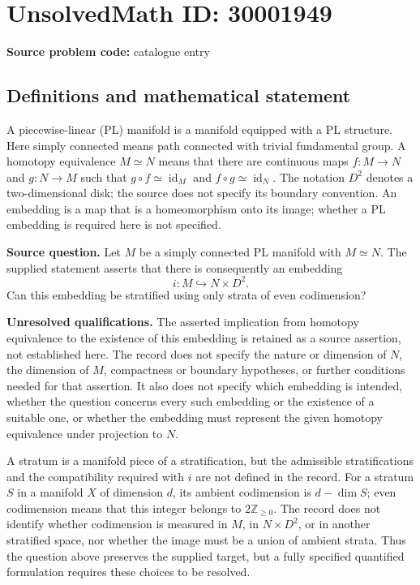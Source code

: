 \documentclass[11pt]{article}
\newcommand{\Z}{\mathbb{Z}}
\begin{document}
\section*{UnsolvedMath ID: 30001949}
\textbf{Source problem code:} catalogue entry
\subsection{Definitions and mathematical statement}
A piecewise-linear (PL) manifold is a manifold equipped with a PL structure. Here simply connected means path connected with trivial fundamental group. A homotopy equivalence \(M\simeq N\) means that there are continuous maps \(f:M\to N\) and \(g:N\to M\) such that \(g\circ f\simeq\operatorname{id}_M\) and \(f\circ g\simeq\operatorname{id}_N\). The notation \(D^2\) denotes a two-dimensional disk; the source does not specify its boundary convention. An embedding is a map that is a homeomorphism onto its image; whether a PL embedding is required here is not specified.

\textbf{Source question.} Let \(M\) be a simply connected PL manifold with \(M\simeq N\). The supplied statement asserts that there is consequently an embedding
\[
 i:M\hookrightarrow N\times D^2.
\]
Can this embedding be stratified using only strata of even codimension?

\textbf{Unresolved qualifications.} The asserted implication from homotopy equivalence to the existence of this embedding is retained as a source assertion, not established here. The record does not specify the nature or dimension of \(N\), the dimension of \(M\), compactness or boundary hypotheses, or further conditions needed for that assertion. It also does not specify which embedding is intended, whether the question concerns every such embedding or the existence of a suitable one, or whether the embedding must represent the given homotopy equivalence under projection to \(N\).

A stratum is a manifold piece of a stratification, but the admissible stratifications and the compatibility required with \(i\) are not defined in the record. For a stratum \(S\) in a manifold \(X\) of dimension \(d\), its ambient codimension is \(d-\dim S\); even codimension means that this integer belongs to \(2\Z_{\geq 0}\). The record does not identify whether codimension is measured in \(M\), in \(N\times D^2\), or in another stratified space, nor whether the image must be a union of ambient strata. Thus the question above preserves the supplied target, but a fully specified quantified formulation requires these choices to be resolved.
\end{document}

